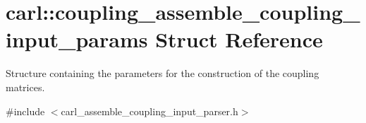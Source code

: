 \hypertarget{structcarl_1_1coupling__assemble__coupling__input__params}{}\section{carl\+:\+:coupling\+\_\+assemble\+\_\+coupling\+\_\+input\+\_\+params Struct Reference}
\label{structcarl_1_1coupling__assemble__coupling__input__params}


Structure containing the parameters for the construction of the coupling matrices.  




{\ttfamily \#include $<$carl\+\_\+assemble\+\_\+coupling\+\_\+input\+\_\+parser.\+h$>$}

